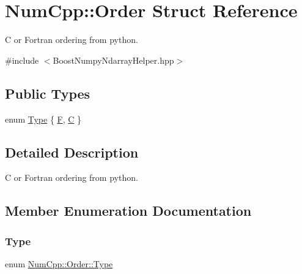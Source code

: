 \hypertarget{struct_num_cpp_1_1_order}{}\section{Num\+Cpp\+:\+:Order Struct Reference}
\label{struct_num_cpp_1_1_order}


C or Fortran ordering from python.  




{\ttfamily \#include $<$Boost\+Numpy\+Ndarray\+Helper.\+hpp$>$}

\subsection*{Public Types}
\begin{DoxyCompactItemize}
\item 
enum \mbox{\hyperlink{struct_num_cpp_1_1_order_a1ec7189cd22800f34d163dec75732c7f}{Type}} \{ \mbox{\hyperlink{struct_num_cpp_1_1_order_a1ec7189cd22800f34d163dec75732c7fa6a68c16c626bc86510e01a394eb96c80}{F}}, 
\mbox{\hyperlink{struct_num_cpp_1_1_order_a1ec7189cd22800f34d163dec75732c7fac8351f23be54b8549a412ab0f4a0543d}{C}}
 \}
\end{DoxyCompactItemize}


\subsection{Detailed Description}
C or Fortran ordering from python. 

\subsection{Member Enumeration Documentation}
\mbox{\label{struct_num_cpp_1_1_order_a1ec7189cd22800f34d163dec75732c7f}} 
\subsubsection{\texorpdfstring{Type}{Type}}
{\footnotesize\ttfamily enum \mbox{\hyperlink{struct_num_cpp_1_1_order_a1ec7189cd22800f34d163dec75732c7f}{Num\+Cpp\+::\+Order\+::\+Type}}}


